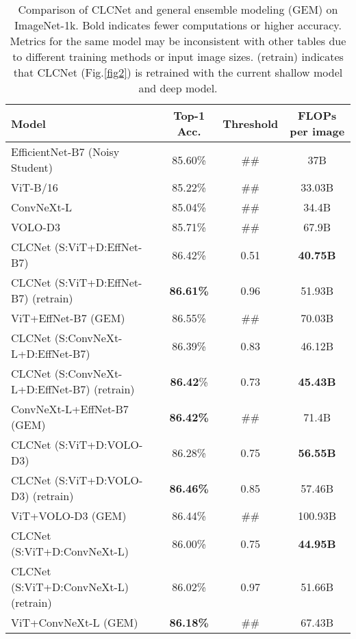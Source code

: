 \documentclass{article}
\begin{document}
\begin{table}
\centering
\caption{Comparison of CLCNet and general ensemble modeling (GEM) on ImageNet-1k. Bold indicates fewer computations or higher accuracy. Metrics for the same model may be inconsistent with other tables due to different training methods or input image sizes. (retrain) indicates that CLCNet (Fig.\ref{fig2}) is retrained with the current shallow model and deep model.}
\vspace{1em}
\label{table3}
\begin{tabular}{@{}l||c|c|c@{}}
\toprule[1.5pt]
Model                             & Top-1 Acc.       & Threshold & FLOPs per image \\ \midrule[1pt]
EfficientNet-B7 (Noisy Student) \cite{xie2020self}   & 85.60\%          & \#\#      & 37B             \\
ViT-B/16 \cite{dosovitskiy2020image}                          & 85.22\%          & \#\#      & 33.03B          \\
ConvNeXt-L \cite{liu2022convnet}                        & 85.04\%          & \#\#      & 34.4B           \\
VOLO-D3 \cite{yuan2021volo}                          & 85.71\%          & \#\#      & 67.9B           \\ \midrule
CLCNet (S:ViT+D:EffNet-B7)        & 86.42\%          & 0.51      & \textbf{40.75B} \\
CLCNet (S:ViT+D:EffNet-B7) (retrain)       & \textbf{86.61\%}          & 0.96     & 51.93B \\
ViT+EffNet-B7 (GEM)               & 86.55\% & \#\#      & 70.03B          \\ \midrule
CLCNet (S:ConvNeXt-L+D:EffNet-B7) & 86.39\%          & 0.83      & 46.12B \\
CLCNet (S:ConvNeXt-L+D:EffNet-B7) (retrain)& \textbf{86.42}\%          & 0.73      & \textbf{45.43B} \\
ConvNeXt-L+EffNet-B7 (GEM)        & \textbf{86.42\%} & \#\#      & 71.4B           \\ \midrule
CLCNet (S:ViT+D:VOLO-D3)          & 86.28\%          & 0.75      & \textbf{56.55B} \\
CLCNet (S:ViT+D:VOLO-D3) (retrain)         & \textbf{86.46\%}          & 0.85      & 57.46B \\
ViT+VOLO-D3 (GEM)                 & 86.44\% & \#\#      & 100.93B         \\ \midrule
CLCNet (S:ViT+D:ConvNeXt-L)       & 86.00\%         & 0.75      & \textbf{44.95B} \\
CLCNet (S:ViT+D:ConvNeXt-L) (retrain)      & 86.02\%         & 0.97      & 51.66B \\
ViT+ConvNeXt-L (GEM)               & \textbf{86.18\%} & \#\#      & 67.43B          \\ \bottomrule[1.5pt]
\end{tabular}
\vspace{0em}
\end{table}
\end{document}
